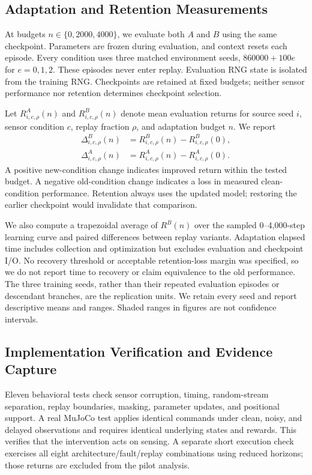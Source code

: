 \documentclass[runningheads]{llncs}
\begin{document}
\subsection{Adaptation and Retention Measurements}
At budgets $n\in\{0,2000,4000\}$, we evaluate both $A$ and $B$ using the same checkpoint. Parameters are frozen during evaluation, and context resets each episode. Every condition uses three matched environment seeds, $860000+100e$ for $e=0,1,2$. These episodes never enter replay. Evaluation RNG state is isolated from the training RNG. Checkpoints are retained at fixed budgets; neither sensor performance nor retention determines checkpoint selection.

Let $R^A_{i,c,\rho}(n)$ and $R^B_{i,c,\rho}(n)$ denote mean evaluation returns for source seed $i$, sensor condition $c$, replay fraction $\rho$, and adaptation budget $n$. We report
\begin{align}
 \Delta^B_{i,c,\rho}(n)&=R^B_{i,c,\rho}(n)-R^B_{i,c,\rho}(0),\\
 \Delta^A_{i,c,\rho}(n)&=R^A_{i,c,\rho}(n)-R^A_{i,c,\rho}(0).
\end{align}
A positive new-condition change indicates improved return within the tested budget. A negative old-condition change indicates a loss in measured clean-condition performance. Retention always uses the updated model; restoring the earlier checkpoint would invalidate that comparison.

We also compute a trapezoidal average of $R^B(n)$ over the sampled 0--4,000-step learning curve and paired differences between replay variants. Adaptation elapsed time includes collection and optimization but excludes evaluation and checkpoint I/O. No recovery threshold or acceptable retention-loss margin was specified, so we do not report time to recovery or claim equivalence to the old performance. The three training seeds, rather than their repeated evaluation episodes or descendant branches, are the replication units. We retain every seed and report descriptive means and ranges. Shaded ranges in figures are not confidence intervals.

\subsection{Implementation Verification and Evidence Capture}
Eleven behavioral tests check sensor corruption, timing, random-stream separation, replay boundaries, masking, parameter updates, and positional support. A real MuJoCo test applies identical commands under clean, noisy, and delayed observations and requires identical underlying states and rewards. This verifies that the intervention acts on sensing. A separate short execution check exercises all eight architecture/fault/replay combinations using reduced horizons; those returns are excluded from the pilot analysis.
\end{document}
